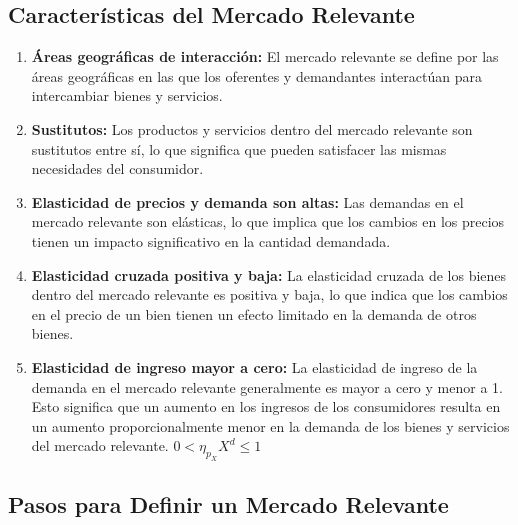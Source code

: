 \documentclass[
  a4paper,
]{article}
\theoremstyle{definition}
\theoremstyle{remark}
\begin{document}
\hypertarget{caracteruxedsticas-del-mercado-relevante}{%
\subsection{Características del Mercado
Relevante}\label{caracteruxedsticas-del-mercado-relevante}}

\begin{enumerate}
\def\labelenumi{\arabic{enumi}.}
\item
  \textbf{Áreas geográficas de interacción:} El mercado relevante se
  define por las áreas geográficas en las que los oferentes y
  demandantes interactúan para intercambiar bienes y servicios.
\item
  \textbf{Sustitutos:} Los productos y servicios dentro del mercado
  relevante son sustitutos entre sí, lo que significa que pueden
  satisfacer las mismas necesidades del consumidor.
\item
  \textbf{Elasticidad de precios y demanda son altas:} Las demandas en
  el mercado relevante son elásticas, lo que implica que los cambios en
  los precios tienen un impacto significativo en la cantidad demandada.
\item
  \textbf{Elasticidad cruzada positiva y baja:} La elasticidad cruzada
  de los bienes dentro del mercado relevante es positiva y baja, lo que
  indica que los cambios en el precio de un bien tienen un efecto
  limitado en la demanda de otros bienes.
\item
  \textbf{Elasticidad de ingreso mayor a cero:} La elasticidad de
  ingreso de la demanda en el mercado relevante generalmente es mayor a
  cero y menor a 1. Esto significa que un aumento en los ingresos de los
  consumidores resulta en un aumento proporcionalmente menor en la
  demanda de los bienes y servicios del mercado relevante.
  \(0 < \eta_{p_{X}} X^d \leq 1\)
\end{enumerate}

\hypertarget{pasos-para-definir-un-mercado-relevante}{%
\subsection{Pasos para Definir un Mercado
Relevante}\label{pasos-para-definir-un-mercado-relevante}}
\end{document}
